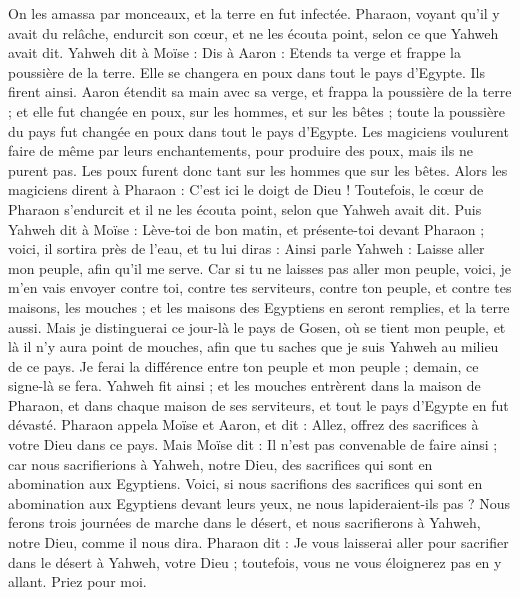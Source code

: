 \begin{multicols}{2}
On les amassa par monceaux, et la terre en fut infectée.
Pharaon, voyant qu'il y avait du relâche, endurcit son cœur, et ne les écouta point, selon ce que Yahweh avait dit.
Yahweh dit à Moïse : Dis à Aaron : Etends ta verge et frappe la poussière de la terre. Elle se changera en poux dans tout le pays d'Egypte.
Ils firent ainsi. Aaron étendit sa main avec sa verge, et frappa la poussière de la terre ; et elle fut changée en poux, sur les hommes, et sur les bêtes ; toute la poussière du pays fut changée en poux dans tout le pays d'Egypte.
Les magiciens voulurent faire de même par leurs enchantements, pour produire des poux, mais ils ne purent pas. Les poux furent donc tant sur les hommes que sur les bêtes.
Alors les magiciens dirent à Pharaon : C'est ici le doigt de Dieu ! Toutefois, le cœur de Pharaon s'endurcit et il ne les écouta point, selon que Yahweh avait dit.
Puis Yahweh dit à Moïse : Lève-toi de bon matin, et présente-toi devant Pharaon ; voici, il sortira près de l'eau, et tu lui diras : Ainsi parle Yahweh : Laisse aller mon peuple, afin qu'il me serve.
Car si tu ne laisses pas aller mon peuple, voici, je m'en vais envoyer contre toi, contre tes serviteurs, contre ton peuple, et contre tes maisons, les mouches ; et les maisons des Egyptiens en seront remplies, et la terre aussi.
Mais je distinguerai ce jour-là le pays de Gosen, où se tient mon peuple, et là il n’y aura point de mouches, afin que tu saches que je suis Yahweh au milieu de ce pays.
Je ferai la différence entre ton peuple et mon peuple ; demain, ce signe-là se fera.
Yahweh fit ainsi ; et les mouches entrèrent dans la maison de Pharaon, et dans chaque maison de ses serviteurs, et tout le pays d'Egypte en fut dévasté.
Pharaon appela Moïse et Aaron, et dit : Allez, offrez des sacrifices à votre Dieu dans ce pays.
Mais Moïse dit : Il n'est pas convenable de faire ainsi ; car nous sacrifierions à Yahweh, notre Dieu, des sacrifices qui sont en abomination aux Egyptiens. Voici, si nous sacrifions des sacrifices qui sont en abomination aux Egyptiens devant leurs yeux, ne nous lapideraient-ils pas ?
Nous ferons trois journées de marche dans le désert, et nous sacrifierons à Yahweh, notre Dieu, comme il nous dira.
Pharaon dit : Je vous laisserai aller pour sacrifier dans le désert à Yahweh, votre Dieu ; toutefois, vous ne vous éloignerez pas en y allant. Priez pour moi.

\end{multicols}
